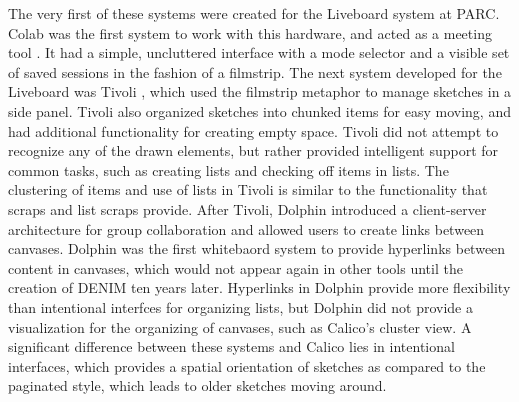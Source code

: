 \documentclass[12pt,fleqn]{ucithesis}
\begin{document}
The very first of these systems were created for the Liveboard system at PARC. Colab was the first system to work with this hardware, and acted as a meeting tool \citep{Stefik}. It had a simple, uncluttered interface with a mode selector and a visible set of saved sessions in the fashion of a filmstrip. The next system developed for the Liveboard was Tivoli \citep{Pederson}, which used the filmstrip metaphor to manage sketches in a side panel. Tivoli also organized sketches into chunked items for easy moving, and had additional functionality for creating empty space. Tivoli did not attempt to recognize any of the drawn elements, but rather provided intelligent support for common tasks, such as creating lists and checking off items in lists. The clustering of items and use of lists in Tivoli is similar to the functionality that scraps and list scraps provide. After Tivoli, Dolphin \citep{Streitz:1994:DIM:192844.193044} introduced a client-server architecture for group collaboration and allowed users to create links between canvases. Dolphin was the first whitebaord system to provide hyperlinks between content in canvases, which would not appear again in other tools until the creation of DENIM ten years later. Hyperlinks in Dolphin provide more flexibility than intentional interfces for organizing lists, but Dolphin did not provide a visualization for the organizing of canvases, such as Calico's cluster view. A significant difference between these systems and Calico lies in intentional interfaces, which provides a spatial orientation of sketches as compared to the paginated style, which leads to older sketches moving around. 
\end{document}
